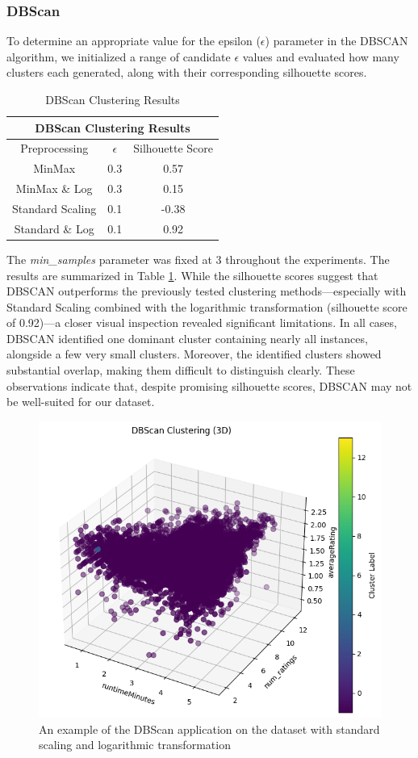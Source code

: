 \documentclass[10pt]{article}
\begin{document}
\subsubsection{DBScan}

To determine an appropriate value for the epsilon ($\epsilon$) parameter in the DBSCAN algorithm, we initialized a range of candidate $\epsilon$ values and evaluated how many clusters each generated, along with their corresponding silhouette scores.
\begin{table}[ht!]
    \centering
    \begin{tabular}{|c|c|c|}
    \hline
    \multicolumn{3}{|c|}{DBScan Clustering Results} \\
    \hline
     Preprocessing & $\epsilon$ & Silhouette Score \\
    \hline
    MinMax & 0.3 & 0.57 \\
    MinMax \& Log & 0.3 & 0.15 \\
    Standard Scaling & 0.1 & -0.38 \\
    Standard \& Log & 0.1 & 0.92 \\
    \hline
    \end{tabular}
    \caption{DBScan Clustering Results}
    \label{table:DB}
\end{table}
The \textit{min\_samples} parameter was fixed at 3 throughout the experiments. The results are summarized in Table  \ref{table:DB}.
While the silhouette scores suggest that DBSCAN outperforms the previously tested clustering methods—especially with Standard Scaling combined with the logarithmic transformation (silhouette score of 0.92)—a closer visual inspection revealed significant limitations. In all cases, DBSCAN identified one dominant cluster containing nearly all instances, alongside a few very small clusters. Moreover, the identified clusters showed substantial overlap, making them difficult to distinguish clearly. These observations indicate that, despite promising silhouette scores, DBSCAN may not be well-suited for our dataset.
\begin{figure}[ht!]
    \centering
    \includegraphics[width=0.4\linewidth]{3d_Dbscan.png}
    \caption{An example of the DBScan application on the dataset with standard scaling and logarithmic transformation}
    \label{fig:3d_Dbscan}
\end{figure}
\end{document}
